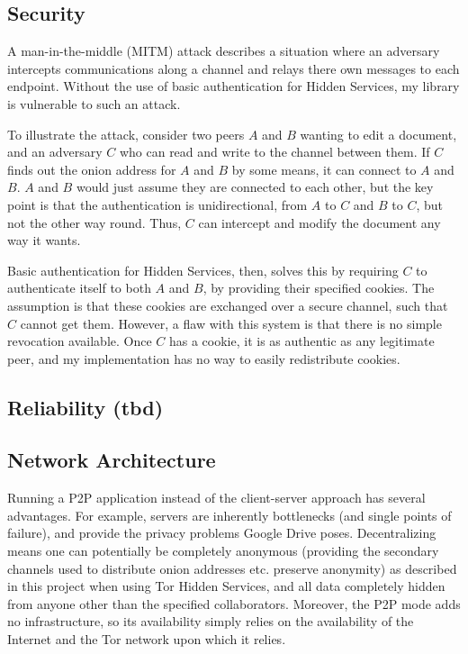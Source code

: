 \documentclass[diss.tex]{subfiles}
\begin{document}
\subsection{Security}
A man-in-the-middle (MITM) attack describes a situation where an adversary intercepts communications along a channel and relays there own messages to each endpoint. Without the use of basic authentication for Hidden Services, my library is vulnerable to such an attack. 

To illustrate the attack, consider two peers $A$ and $B$ wanting to edit a document, and an adversary $C$ who can read and write to the channel between them. If $C$ finds out the onion address for $A$ and $B$ by some means, it can connect to $A$ and $B$. $A$ and $B$ would just assume they are connected to each other, but the key point is that the authentication is unidirectional, from $A$ to $C$ and $B$ to $C$, but not the other way round. Thus, $C$ can intercept and modify the document any way it wants. 

Basic authentication for Hidden Services, then, solves this by requiring $C$ to authenticate itself to both $A$ and $B$, by providing their specified cookies. The assumption is that these cookies are exchanged over a secure channel, such that $C$ cannot get them. However, a flaw with this system is that there is no simple revocation available. Once $C$ has a cookie, it is as authentic as any legitimate peer, and my implementation has no way to easily redistribute cookies.
\subsection{Reliability (tbd)}
\subsection{Network Architecture}
Running a P2P application instead of the client-server approach has several advantages. For example, servers are inherently bottlenecks (and single points of failure), and provide the privacy problems Google Drive poses. Decentralizing means one can potentially be completely anonymous (providing the secondary channels used to distribute onion addresses etc. preserve anonymity) as described in this project when using Tor Hidden Services, and all data completely hidden from anyone other than the specified collaborators. Moreover, the P2P mode adds no infrastructure, so its availability simply relies on the availability of the Internet and the Tor network upon which it relies.
\end{document}
